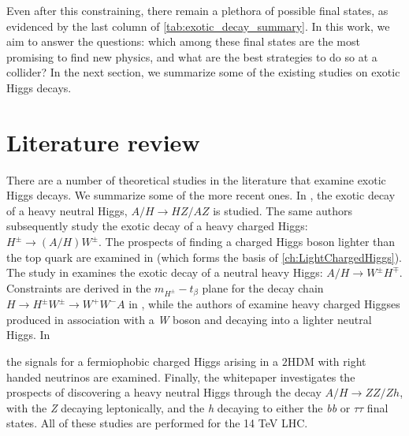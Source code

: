 Even after this constraining, there remain a plethora of possible final states, as evidenced by the last column of \autoref{tab:exotic_decay_summary}. In this work, we aim to answer the questions: which among these final states are the most promising to find new physics, and what are the best strategies to do so at a collider? In the next section, we summarize some of the existing studies on exotic Higgs decays.

\section{Literature review}\label{sec:literature_review}
There are a number of theoretical studies in the literature that examine exotic Higgs decays. We summarize some of the more recent ones. In \cite{Coleppa2014a}, the exotic decay of a heavy neutral Higgs, $A/H\rightarrow HZ/AZ$ is studied. The same authors subsequently study the exotic decay of a heavy charged Higgs: $H^\pm\rightarrow (A/H)W^\pm$. The prospects of finding a charged Higgs boson lighter than the top quark are examined in \cite{Kling:2015uba} (which forms the basis of \autoref{ch:LightChargedHiggs}). The study in \cite{Li:2015lra} examines the exotic decay of a neutral heavy Higgs: $A/H\rightarrow W^\pm H^\mp$. Constraints are derived in the $m_{H^\pm}-t_\beta$ plane for the decay chain $H\rightarrow H^\pm W^\pm\rightarrow W^+W^- A$ in \cite{Dermisek:2013cxa}, while the authors of \cite{Basso:2012st} examine heavy charged Higgses produced in association with a \emph{W} boson and decaying into a lighter neutral Higgs. In {\cite{Maitra:2014qea} the signals for a fermiophobic charged Higgs arising in a $2$HDM with right handed neutrinos are examined. Finally, the whitepaper \cite{Brownson:2013lka} investigates the prospects of discovering a heavy neutral Higgs through the decay $A/H\rightarrow ZZ/Zh$, with the \emph{Z} decaying leptonically, and the \emph{h} decaying to either the \emph{bb} or $\tau\tau$ final states. All of these studies are performed for the 14 TeV LHC.

}
